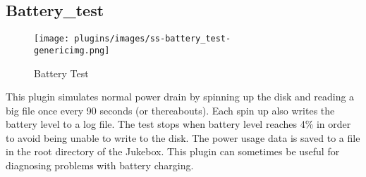 \subsection{Battery\_test}
\begin{figure}[h!]
\begin{center}
\texttt{[image: plugins/images/ss-battery\_test-\\genericimg.png]}
\end{center}
\caption{Battery Test}
\end{figure}

This plugin simulates normal power drain by spinning up the disk and
reading a big file once every 90 seconds (or thereabouts). Each
spin up also writes the battery level to a
log file. The test stops when battery level reaches 4\% in order to
avoid being unable to write to the disk.  The power usage data is saved
to a file in the root directory of the Jukebox.  This plugin can
sometimes be useful for diagnosing problems with battery charging.

